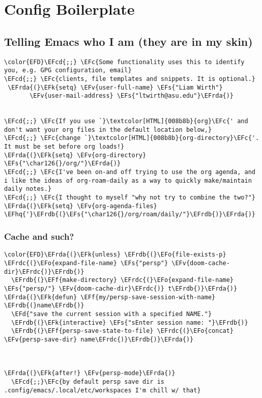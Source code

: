 \documentclass{article}
\newcommand{\EFc}[1]{\textcolor{EFc}{#1}} %
\newcommand{\EFcd}[1]{\textcolor{EFcd}{#1}} %
\newcommand{\EFs}[1]{\textcolor{EFs}{#1}} %
\newcommand{\EFd}[1]{\textcolor{EFd}{#1}} %
\newcommand{\EFk}[1]{\textcolor{EFk}{#1}} %
\newcommand{\EFf}[1]{\textcolor{EFf}{#1}} %
\newcommand{\EFv}[1]{\textcolor{EFv}{#1}} %
\newcommand{\EFo}[1]{\textcolor{EFo}{#1}} %
\newcommand{\EFhq}[1]{#1} %
\newcommand{\EFrda}[1]{\textcolor{EFrda}{#1}} %
\newcommand{\EFrdb}[1]{\textcolor{EFrdb}{#1}} %
\newcommand{\EFrdc}[1]{\textcolor{EFrdc}{#1}} %
\begin{document}
\section{Config Boilerplate}
\label{sec:org9129338}
\subsection{Telling Emacs who I am (they are in my skin)}
\label{sec:org9aa5362}
\begin{Code}
\begin{Verbatim}
\color{EFD}\EFcd{;;} \EFc{Some functionality uses this to identify you, e.g. GPG configuration, email}
\EFcd{;;} \EFc{clients, file templates and snippets. It is optional.}
 \EFrda{(}\EFk{setq} \EFv{user-full-name} \EFs{"Liam Wirth"}
       \EFv{user-mail-address} \EFs{"ltwirth@asu.edu"}\EFrda{)}


\EFcd{;;} \EFc{If you use `}\textcolor[HTML]{008b8b}{org}\EFc{' and don't want your org files in the default location below,}
\EFcd{;;} \EFc{change `}\textcolor[HTML]{008b8b}{org-directory}\EFc{'. It must be set before org loads!}
\EFrda{(}\EFk{setq} \EFv{org-directory} \EFs{"\char126{}/org/"}\EFrda{)}
\EFcd{;;} \EFc{I've been on-and off trying to use the org agenda, and i like the ideas of org-roam-daily as a way to quickly make/maintain daily notes.}
\EFcd{;;} \EFc{I thought to myself "why not try to combine the two?"}
\EFrda{(}\EFk{setq} \EFv{org-agenda-files} \EFhq{'}\EFrdb{(}\EFs{"\char126{}/org/roam/daily/"}\EFrdb{)}\EFrda{)}
\end{Verbatim}
\end{Code}

\subsubsection{Cache and such?}
\label{sec:orgd81de51}
\begin{Code}
\begin{Verbatim}
\color{EFD}\EFrda{(}\EFk{unless} \EFrdb{(}\EFo{file-exists-p} \EFrdc{(}\EFo{expand-file-name} \EFs{"persp"} \EFv{doom-cache-dir}\EFrdc{)}\EFrdb{)}
  \EFrdb{(}\EFf{make-directory} \EFrdc{(}\EFo{expand-file-name} \EFs{"persp/"} \EFv{doom-cache-dir}\EFrdc{)} t\EFrdb{)}\EFrda{)}
\EFrda{(}\EFk{defun} \EFf{my/persp-save-session-with-name} \EFrdb{(}name\EFrdb{)}
  \EFd{"save the current session with a specified NAME."}
  \EFrdb{(}\EFk{interactive} \EFs{"sEnter session name: "}\EFrdb{)}
  \EFrdb{(}\EFf{persp-save-state-to-file} \EFrdc{(}\EFo{concat} \EFv{persp-save-dir} name\EFrdc{)}\EFrdb{)}\EFrda{)}



\EFrda{(}\EFk{after!} \EFv{persp-mode}\EFrda{)}
  \EFcd{;;}\EFc{by default persp save dir is .config/emacs/.local/etc/workspaces I'm chill w/ that}


\end{Verbatim}
\end{Code}
\end{document}
